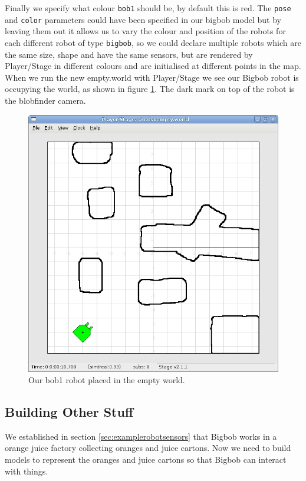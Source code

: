 \documentclass[a4paper]{report}
\newcommand{\plst}{Player/Stage\xspace}
\begin{document}
Finally we specify what colour \verb|bob1| should be, by default this is red. The \verb|pose| and \verb|color| parameters could have been specified in our bigbob model but by leaving them out it allows us to vary the colour and position of the robots for each different robot of type \verb|bigbob|, so we could declare multiple robots which are the same size, shape and have the same sensors, but are rendered by \plst in different colours and are initialised at different points in the map.\newline
When we run the new empty.world with \plst we see our Bigbob robot is occupying the world, as shown in figure \ref{fig:finalRobotBuild}. The dark mark on top of the robot is the blobfinder camera.

\begin{figure}
	\centering
	\includegraphics[width=0.7\linewidth]{./pics/robot_building/final_robot_build.png} 
	\caption{Our bob1 robot placed in the empty world.}
	\label{fig:finalRobotBuild}
\end{figure}


\subsection{Building Other Stuff} \label{sec:otherStuff}
We established in section \ref{sec:examplerobotsensors} that Bigbob works in a orange juice factory collecting oranges and juice cartons. Now we need to build models to represent the oranges and juice cartons so that Bigbob can interact with things.
\end{document}

